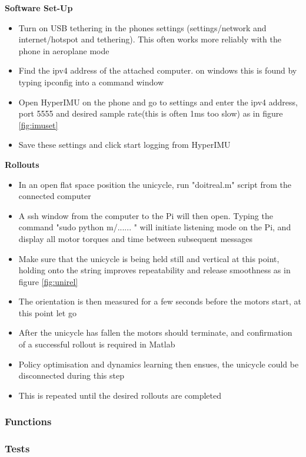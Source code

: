 \documentclass[twoside,twocolumn,12pt]{article}
\begin{document}
\textbf{Software Set-Up}
\begin{itemize}
\item Turn on USB tethering in the phones settings (settings/network and internet/hotspot and tethering). This often works more reliably with the phone in aeroplane mode
\item Find the ipv4 address of the attached computer. on windows this is found by typing ipconfig into a command window
\item Open HyperIMU on the phone and go to settings and enter the ipv4 address, port 5555 and desired sample rate(this is often 1ms too slow) as in figure \ref{fig:imuset}
\item Save these settings and click start logging from HyperIMU
\end{itemize}
\textbf{Rollouts}
\begin{itemize}
\item In an open flat space position the unicycle, run "doitreal.m" script from the connected computer
\item A ssh window from the computer to the Pi will then open. Typing the command "sudo python m/...... " will initiate listening mode on the Pi, and display all motor torques and time between subsequent messages
\item Make sure that the unicycle is being held still and vertical at this point, holding onto the string improves repeatability and release smoothness as in figure \ref{fig:unirel}
\item The orientation is then measured for a few seconds before the motors start, at this point let go
\item After the unicycle has fallen the motors should terminate, and confirmation of a successful rollout is required in Matlab 
\item Policy optimisation and dynamics learning then ensues, the unicycle could be disconnected during this step
\item This is repeated until the desired rollouts are completed
\end{itemize}

\twocolumn
\subsubsection{Functions}



\subsubsection{Tests}
\end{document}
